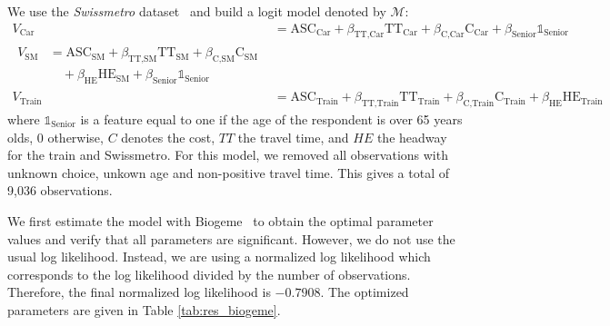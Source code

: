 \documentclass[conference]{IEEEtran}
\begin{document}
We use the {\it Swissmetro} dataset~\cite{bierlaire_acceptance_2001} and build a logit model denoted by $\mathcal{M}$:
\begin{align}
\label{eq:model}
V_{\text{Car}} &= \text{ASC}_{\text{Car}} + \beta_{\text{TT,Car}} \text{TT}_{\text{Car}} + \beta_{\text{C,Car}} \text{C}_{\text{Car}} + \beta_{\text{Senior}}\mathbb{1}_{\text{Senior}} \nonumber \\
\begin{split}
V_{\text{SM}} &= \text{ASC}_{\text{SM}} + \beta_{\text{TT,SM}} \text{TT}_{\text{SM}} + \beta_{\text{C,SM}} \text{C}_{\text{SM}} \\
& \quad + \beta_{\text{HE}} \text{HE}_{\text{SM}} + \beta_{\text{Senior}}\mathbb{1}_{\text{Senior}}
\end{split} \\
V_{\text{Train}} &= \text{ASC}_{\text{Train}} + \beta_{\text{TT,Train}} \text{TT}_{\text{Train}} + \beta_{\text{C,Train}} \text{C}_{\text{Train}} + \beta_{\text{HE}} \text{HE}_{\text{Train}} \nonumber
\end{align}
where $\mathbb{1}_{\text{Senior}}$ is a feature equal to one if the age of the respondent is over 65 years olds, 0 otherwise, $C$ denotes the cost, $TT$ the travel time, and $HE$ the headway for the train and Swissmetro. For this model, we removed all observations with unknown choice, unkown age and non-positive travel time. This gives a total of 9,036 observations.
 
We first estimate the model with Biogeme~\cite{bierlaire_biogeme:_2003} to obtain the optimal parameter values and verify that all parameters are significant. However, we do not use the usual log likelihood. Instead, we are using a normalized log likelihood which corresponds to the log likelihood divided by the number of observations. Therefore, the final normalized log likelihood is $-0.7908$. The optimized parameters are given in Table \ref{tab:res_biogeme}.
\end{document}
